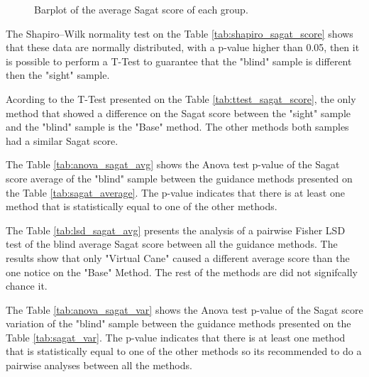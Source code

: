 

\begin{figure}[!htb]
    \centering
    \resizebox{0.6\linewidth}{!}{
    
    }
    \caption{Barplot of the average Sagat score of each group.}
    \label{fig:barplot_sagat}
\end{figure}

The Shapiro–Wilk normality test on the Table \ref{tab:shapiro_sagat_score} shows that these data are normally distributed, with a p-value higher than 0.05, then it is possible to perform a T-Test to guarantee that the "blind" sample is different then the "sight" sample.



Acording to the T-Test presented on the Table \ref{tab:ttest_sagat_score}, the only method that showed a difference on the Sagat score between the "sight" sample and the "blind" sample is the "Base" method. The other methods both samples had a similar Sagat score.



The Table \ref{tab:anova_sagat_avg} shows the Anova test p-value of the Sagat score average of the "blind" sample between the guidance methods presented on the Table \ref{tab:sagat_average}. The p-value indicates that there is at least one method that is statistically equal to one of the other methods.



The Table \ref{tab:lsd_sagat_avg} presents the analysis of a pairwise Fisher LSD test of the blind average Sagat score  between all the guidance methods. The results show that only "Virtual Cane" caused a different average score than the one notice on the "Base" Method. The rest of the methods are did not signifcally chance it.



The Table \ref{tab:anova_sagat_var} shows the Anova test p-value of the Sagat score variation of the "blind" sample between the guidance methods presented on the Table \ref{tab:sagat_var}. The p-value indicates that there is at least one method that is statistically equal to one of the other methods so its recommended to do a pairwise analyses between all the methods.



